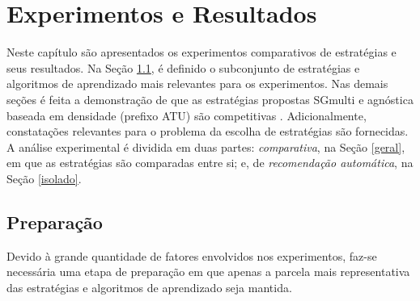 \chapter{Experimentos e Resultados}\label{experimentos}
Neste capítulo são apresentados os experimentos comparativos de estratégias
e seus resultados.
Na Seção \ref{prep}, é definido o subconjunto de estratégias e algoritmos de aprendizado
mais relevantes para os experimentos.
Nas demais seções é feita a demonstração de que as estratégias propostas SGmulti e
agnóstica baseada em densidade (prefixo ATU) são competitivas .
Adicionalmente, constatações relevantes para o problema da escolha de estratégias
são fornecidas.
A análise experimental é dividida em duas partes: 
\textit{comparativa}, na Seção \ref{geral}, em que as estratégias são comparadas
entre si;
e, de \textit{recomendação automática},
na Seção \ref{isolado}.

\section{Preparação} \label{prep}
Devido à grande quantidade de fatores envolvidos nos experimentos,
faz-se necessária uma etapa de preparação em que apenas
a parcela mais representativa das estratégias e algoritmos de aprendizado
seja mantida.

